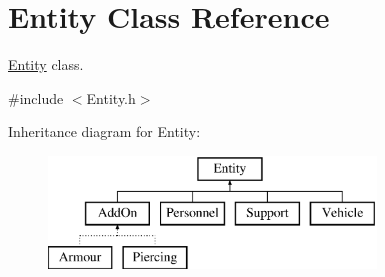 \hypertarget{classEntity}{}\section{Entity Class Reference}
\label{classEntity}


\hyperlink{classEntity}{Entity} class.  




{\ttfamily \#include $<$Entity.\+h$>$}

Inheritance diagram for Entity\+:\begin{figure}[H]
\begin{center}
\leavevmode
\includegraphics[height=3.000000cm]{classEntity}
\end{center}
\end{figure}

